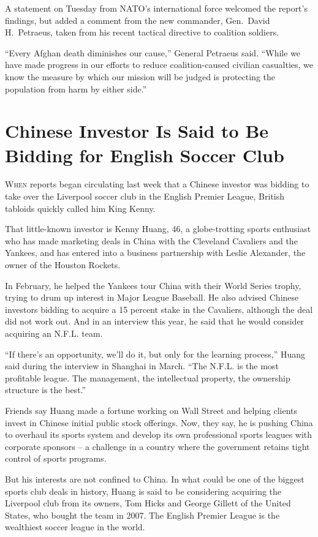 ﻿\documentclass[12pt]{article}
\begin{document}
A statement on Tuesday from NATO's international force welcomed the report's findings, but added a
comment from the new commander, Gen.~David H.~Petraeus, taken from his recent tactical directive to
coalition soldiers.

``Every Afghan death diminishes our cause,'' General Petraeus said. ``While we have made progress in
our efforts to reduce coalition-caused civilian casualties, we know the measure by which our mission
will be judged is protecting the population from harm by either side.''

\section{Chinese Investor Is Said to Be Bidding for English Soccer Club}

\lettrine{W}{hen} reports began circulating last week that a Chinese
investor was bidding to take over the Liverpool soccer club in the English Premier League, British
tabloids quickly called him King Kenny.

That little-known investor is Kenny Huang, 46, a globe-trotting sports enthusiast who has made
marketing deals in China with the Cleveland Cavaliers and the Yankees, and has entered into a
business partnership with Leslie Alexander, the owner of the Houston Rockets.

In February, he helped the Yankees tour China with their World Series trophy, trying to drum up
interest in Major League Baseball. He also advised Chinese investors bidding to acquire a 15 percent
stake in the Cavaliers, although the deal did not work out. And in an interview this year, he said
that he would consider acquiring an N.F.L. team.

``If there's an opportunity, we'll do it, but only for the learning process,'' Huang said during the
interview in Shanghai in March. ``The N.F.L. is the most profitable league. The management, the
intellectual property, the ownership structure is the best.''

Friends say Huang made a fortune working on Wall Street and helping clients invest in Chinese
initial public stock offerings. Now, they say, he is pushing China to overhaul its sports system and
develop its own professional sports leagues with corporate sponsors -- a challenge in a country
where the government retains tight control of sports programs.

But his interests are not confined to China. In what could be one of the biggest sports club deals
in history, Huang is said to be considering acquiring the Liverpool club from its owners, Tom Hicks
and George Gillett of the United States, who bought the team in 2007. The English Premier League is
the wealthiest soccer league in the world.
\end{document}
